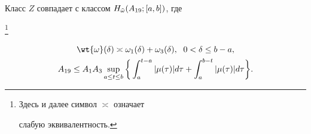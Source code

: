 \begin{lem}


Класс $Z$ совпадает с классом $H_{\Tilde{\omega}}(A_{19};[a,b])$, где


\footnote{Здесь и далее символ $\asymp $ означает


слабую эквивалентность.}


\begin{gather*}


\wt{\omega}(\delta)\asymp \omega_1(\delta)+\omega_3(\delta),\ \;


0<\delta\leq b-a,\\


%


A_{19}\leq A_1A_3 \sup_{a\leq t\leq b}


\bigg\{ \int_a^{t-a}|\mu(\tau)| d\tau + \int_a^{b-t}


|\mu(\tau)| d\tau \bigg\} .


\end{gather*}


\end{lem}





